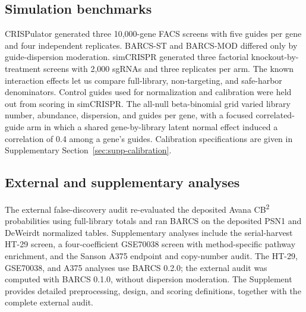 \subsection{Simulation benchmarks}

CRISPulator generated three 10,000-gene FACS screens with five guides per gene
and four independent replicates.  BARCS-ST and BARCS-MOD differed only by
guide-dispersion moderation.  simCRISPR generated three factorial
knockout-by-treatment screens with 2,000 sgRNAs and three replicates per arm.
The known interaction effects let us compare full-library, non-targeting, and
safe-harbor denominators.  Control guides used for normalization and
calibration were held out from scoring in simCRISPR. The all-null
beta-binomial grid varied library number, abundance, dispersion, and guides
per gene, with a focused correlated-guide arm in which a shared gene-by-library
latent normal effect induced a correlation of 0.4 among a gene's guides.  Calibration specifications are
given in Supplementary Section~\ref{sec:supp-calibration}.

\subsection{External and supplementary analyses}

The external false-discovery audit re-evaluated the deposited Avana
CB\textsuperscript{2} probabilities using full-library totals and ran BARCS on
the deposited PSN1 and DeWeirdt normalized tables.  Supplementary analyses
include the serial-harvest HT-29 screen, a four-coefficient GSE70038 screen
with method-specific pathway enrichment, and the Sanson A375 endpoint and
copy-number audit.  The HT-29, GSE70038, and A375 analyses use BARCS 0.2.0;
the external audit was computed with BARCS 0.1.0, without dispersion
moderation.  The Supplement provides detailed preprocessing, design,
and scoring definitions, together with the complete external audit.
